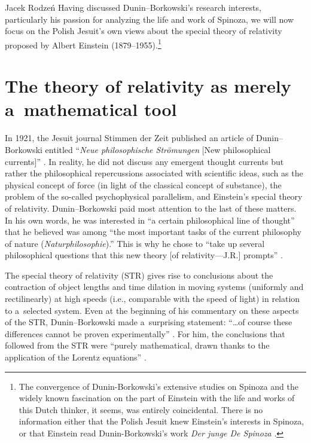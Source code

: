 \begin{artengenv}{Jacek Rodzeń}
Having discussed Dunin–Borkowski's research interests, particularly his passion for analyzing the life and work of Spinoza, we will now focus on the Polish Jesuit's own views about the special theory of relativity proposed by Albert Einstein (1879–1955).\footnote{The convergence of Dunin-Borkowski's extensive studies on Spinoza and the widely known fascination on the part of Einstein with the life and works of this Dutch thinker, it seems, was entirely coincidental. There is no information either that the Polish Jesuit knew Einstein's interests in Spinoza, or that Einstein read Dunin-Borkowski's work \textit{Der junge De Spinoza}
\parencite*[][]{dunin-borkowski_junge_1910}.%
}

\section{The theory of relativity as merely\\a~mathematical tool}
In 1921, the Jesuit journal Stimmen der Zeit published an article of Dunin–Borkowski entitled ``\textit{Neue philosophische Strömungen} [New philosophical currents]''
\parencite*[][]{dunin-borkowski_neue_1921}. %
 In reality, he did not discuss any emergent thought currents but rather the philosophical repercussions associated with scientific ideas, such as the physical concept of force (in light of the classical concept of substance), the problem of the so-called psychophysical parallelism, and Einstein's special theory of relativity. Dunin–Borkowski paid most attention to the last of these matters. In his own words, he was interested in ``a certain philosophical line of thought'' that he believed was among ``the most important tasks of the current philosophy of nature (\textit{Naturphilosophie}).'' This is why he chose to ``take up several philosophical questions that this new theory [of relativity---J.R.] prompts'' 
\parencite*[][p.211]{dunin-borkowski_neue_1921}.%


The special theory of relativity (STR) gives rise to conclusions about the contraction of object lengths and time dilation in moving systems (uniformly and rectilinearly) at high speeds (i.e., comparable with the speed of light) in relation to a~selected system. Even at the beginning of his commentary on these aspects of the STR, Dunin–Borkowski made a~surprising statement: ``…of course these differences cannot be proven experimentally''
\parencite*[][p.211]{dunin-borkowski_neue_1921}. %
 For him, the conclusions that followed from the STR were ``purely mathematical, drawn thanks to the application of the Lorentz equations'' 
\parencite*[][p.212]{dunin-borkowski_neue_1921}.%



\end{artengenv}
